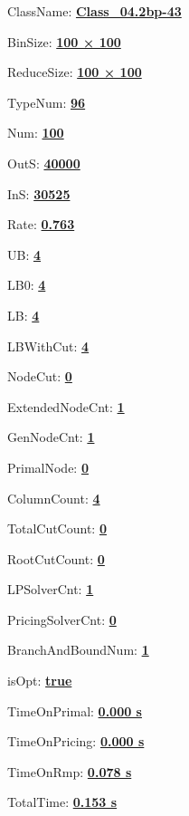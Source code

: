 \documentclass[11pt]{article}
\begin{document}
\pagestyle{empty}


ClassName: \underline{\textbf{Class_04.2bp-43}}
\par
BinSize: \underline{\textbf{100 × 100}}
\par
ReduceSize: \underline{\textbf{100 × 100}}
\par
TypeNum: \underline{\textbf{96}}
\par
Num: \underline{\textbf{100}}
\par
OutS: \underline{\textbf{40000}}
\par
InS: \underline{\textbf{30525}}
\par
Rate: \underline{\textbf{0.763}}
\par
UB: \underline{\textbf{4}}
\par
LB0: \underline{\textbf{4}}
\par
LB: \underline{\textbf{4}}
\par
LBWithCut: \underline{\textbf{4}}
\par
NodeCut: \underline{\textbf{0}}
\par
ExtendedNodeCnt: \underline{\textbf{1}}
\par
GenNodeCnt: \underline{\textbf{1}}
\par
PrimalNode: \underline{\textbf{0}}
\par
ColumnCount: \underline{\textbf{4}}
\par
TotalCutCount: \underline{\textbf{0}}
\par
RootCutCount: \underline{\textbf{0}}
\par
LPSolverCnt: \underline{\textbf{1}}
\par
PricingSolverCnt: \underline{\textbf{0}}
\par
BranchAndBoundNum: \underline{\textbf{1}}
\par
isOpt: \underline{\textbf{true}}
\par
TimeOnPrimal: \underline{\textbf{0.000 s}}
\par
TimeOnPricing: \underline{\textbf{0.000 s}}
\par
TimeOnRmp: \underline{\textbf{0.078 s}}
\par
TotalTime: \underline{\textbf{0.153 s}}
\par
\newpage
\end{document}
